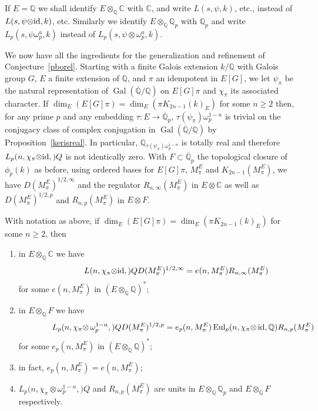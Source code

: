 \documentclass{amsart}
\begin{document}
\begin{remark}\label{idenrem}
If $ E={\mathbb Q} $ we shall identify $ E{\otimes}_{\mathbb Q} {\mathbb C} $ with $ {\mathbb C} $, and write $ {L(s,{\psi},k)}$, etc.,
instead of $ {L(s,{\psi{\otimes}{\textup{id}}},k)}$, etc.  Similarly we identify $ E{\otimes}_{\mathbb Q}{{\mathbb Q_p}} $ with $ {{\mathbb Q_p}} $
and write $ {L_{p}(s,{\psi}\omega_p^a,k)}$ instead of  $ {L_{p}(s,{\psi}{\otimes}\omega_p^a,k)}$.
\end{remark}

We now have all the ingredients for the generalization and refinement of Conjecture~\ref{pborel}.
Starting with a finite Galois extension $ k/{\mathbb Q} $ with Galois group $ G $, $ E $ a finite extension of
$ {\mathbb Q} $,
and $ \pi $ an idempotent in $ E[G] $, we let $ \psi_\pi $ be the natural representation
of $ {\operatorname{Gal}}({\overline{\mathbb Q}}/{\mathbb Q}) $ on $ E[G]\pi $ and $ \chi_\pi $ its associated character.  If
$ \dim_E(E[G]\pi) = \dim_E(\pi {K_{2n-1}(k)_E}) $ for some $ n \ge 2 $ then,
for any prime $ p $ and any embedding $ {\tau} : E \to {{\overline {\mathbb Q}_p}} $,
$ {\tau}(\psi_\pi) \omega_p^{1-n} $ is trivial on the conjugacy class of complex conjugation
in $ {\operatorname{Gal}}({\overline{\mathbb Q}}/{\mathbb Q}) $ by Proposition~\ref{kerisreal}.
In particular, $ {\mathbb Q}_{{\tau}(\psi_\pi)\omega_p^{1-n}} $ is totally real
and therefore $ {L_{p}(n,{\chi_\pi{\otimes}{\textup{id}}},{\mathbb)}Q} $ is not identically zero.
With $ F \subset {{\overline {\mathbb Q}_p}} $ the topological closure of $ \phi_p(k) $ as before,
using ordered bases for $ E[G]\pi $, $ M_\pi^E $ and $ {{K_{2n-1}(M_\pi^E)}}$,
we have $ D(M_\pi^E)^{1/2,\infty} $ and the regulator $ R_{n,\infty}(M_\pi^E) $ in $ E {\otimes} {\mathbb C} $ as well
as $ D(M_\pi^E)^{1/2,p} $ and  $ R_{n,p}(M_\pi^E) $ in $ E {\otimes} F $.

\begin{conjecture}\label{motiveconjecture}
With notation as above, if $ \dim_E(E[G]\pi) = \dim_E(\pi {K_{2n-1}(k)_E}) $ for some $ n \ge 2 $, then
\begin{enumerate}
\item
in $ E {\otimes}_{\mathbb Q} {\mathbb C} $ we have
\[
\qquad\qquad
{L(n,{\chi_\pi{\otimes}{\textup{id}}},{\mathbb)}Q}  D(M_\pi^E)^{1/2,\infty} = e(n, M_\pi^E) R_{n,\infty}(M_\pi^E)
\]
for some $ e(n, M_\pi^E) $ in $ (E{\otimes}_{\mathbb Q} {\mathbb Q})^* $;
\item
in $ E {\otimes}_{\mathbb Q} F $ we have
\[
\qquad\qquad
{L_{p}(n,{\chi_\pi}{\otimes}\,\omega_p^{1-n},{\mathbb)}Q} D(M_\pi^E)^{1/2,p}  = e_p(n,M_\pi^E) \, {\textup{Eul}}_p(n, \chi_\pi{\otimes}\,{\textup{id}},{\mathbb Q}) R_{n,p}(M_\pi^E)
\]
for some $ e_p(n,M_\pi^E) $ in $ (E{\otimes}_{\mathbb Q} {\mathbb Q})^* $;
\item
in fact, $ e_p(n, M_\pi^E) = e(n, M_\pi^E) $;
\item
$ {L_{p}(n,{\chi_\pi}{\otimes}\omega_p^{1-n},{\mathbb)}Q} $ and $ R_{n,p}(M_\pi^E) $ are units in $ E {\otimes}_{\mathbb Q} {{\mathbb Q_p}} $
and $ E {\otimes}_{\mathbb Q} F $ respectively.
\end{enumerate}
\end{conjecture}
\end{document}
